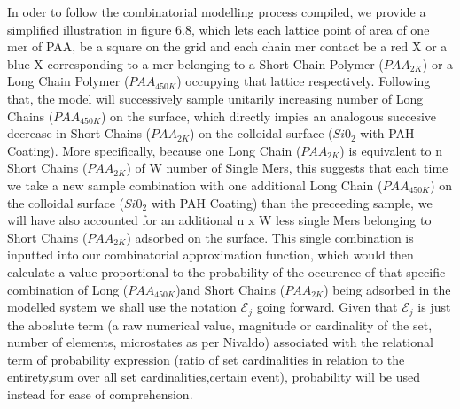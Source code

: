 \documentclass[journal=jacsat,manuscript=article]{achemso}
\begin{document}
In oder to follow the combinatorial modelling process compiled, we provide a simplified illustration in figure 6.8, which lets each lattice point of area of one mer of PAA, be a square on the grid and each chain mer contact be a red X or a blue X corresponding to a mer belonging to a Short Chain Polymer ($PAA_{2K}$) or a Long Chain Polymer ($PAA_{450K}$) occupying that lattice respectively. Following that, the model will successively sample unitarily increasing  number of Long Chains ($PAA_{450K}$) on the surface, which directly impies an analogous succesive decrease in Short Chains ($PAA_{2K}$) on the colloidal surface ($Si0_2$ with PAH Coating). More specifically, because one 
Long Chain ($PAA_{2K}$) is equivalent to n Short Chains ($PAA_{2K}$) of W number of Single Mers, this suggests that each time we take a new sample combination with one additional Long Chain ($PAA_{450K}$) on the colloidal surface ($Si0_2$ with PAH Coating) than the preceeding sample, we will have also accounted for an additional n x W less single Mers belonging to Short Chains ($PAA_{2K}$) adsorbed on the surface. This single combination is inputted into our combinatorial approximation function, which would then calculate a value proportional to the probability of the occurence of that specific combination of Long ($PAA_{450K}$)and Short Chains ($PAA_{2K}$) being adsorbed in the modelled system we shall use the notation $\mathcal{E}_{j}$ going forward.  Given that $\mathcal{E}_{j}$ is just the aboslute term (a raw numerical value, magnitude or cardinality of the set, number of elements, microstates as per Nivaldo) associated with the relational term of probability expression (ratio of set cardinalities in relation to the entirety,sum over all set cardinalities,certain event), probability will be used instead for ease of comprehension.
\end{document}
